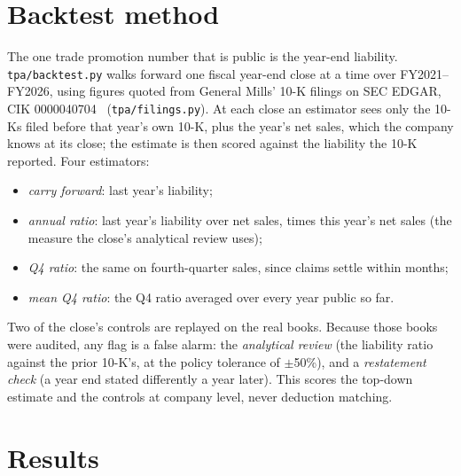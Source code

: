 \documentclass[10pt,letterpaper]{article}
\begin{document}
\section{Backtest method}
\label{sec:backtest-method}
The one trade promotion number that is public is the year-end liability. \texttt{tpa/backtest.py} walks
forward one fiscal year-end close at a time over FY2021--FY2026, using figures quoted from General Mills'
10-K filings on SEC EDGAR, CIK 0000040704~\cite{gis21,gis22,gis23,gis24,gis25,gis26} (\texttt{tpa/filings.py}). At each close an estimator sees only the 10-Ks filed
before that year's own 10-K, plus the year's net sales, which the company knows at its close; the estimate
is then scored against the liability the 10-K reported. Four estimators:
\begin{itemize}\itemsep0pt
\item \emph{carry forward}: last year's liability;
\item \emph{annual ratio}: last year's liability over net sales, times this year's net sales (the measure the
close's analytical review uses);
\item \emph{Q4 ratio}: the same on fourth-quarter sales, since claims settle within months;
\item \emph{mean Q4 ratio}: the Q4 ratio averaged over every year public so far.
\end{itemize}
Two of the close's controls are replayed on the real books. Because those books were audited, any flag is a
false alarm: the \emph{analytical review} (the liability ratio against the prior 10-K's, at the policy
tolerance of $\pm$50\%), and a \emph{restatement check} (a year end stated differently a year later).
This scores the top-down estimate and the controls at company level, never deduction matching.

\section{Results}
\end{document}
